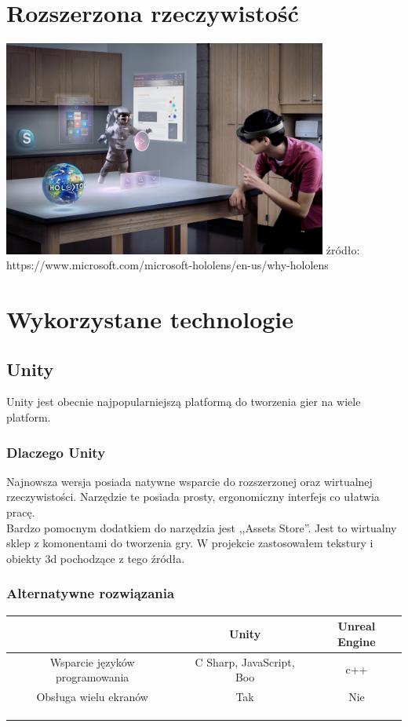 \documentclass[12pt]{article}
\begin{document}
\section{Rozszerzona rzeczywistość}

\begin{center}
\includegraphics[width=0.8\textwidth]{images/hololens.png}
\small {źródło: https://www.microsoft.com/microsoft-hololens/en-us/why-hololens }
\end{center}

\section{Wykorzystane technologie}

\subsection{Unity}
Unity jest obecnie najpopularniejszą platformą do tworzenia gier na wiele platform. 
\subsubsection{Dlaczego Unity}
Najnowsza wersja posiada natywne wsparcie do rozszerzonej oraz wirtualnej rzeczywistości. Narzędzie te posiada prosty, ergonomiczny interfejs co ułatwia pracę.\\
Bardzo pomocnym dodatkiem do narzędzia jest ,,Assets Store''. Jest to wirtualny sklep z komonentami do tworzenia gry. W projekcie zastosowałem tekstury i obiekty 3d pochodzące z tego źródła.
\subsubsection{Alternatywne rozwiązania}
 \begin{tabular}{|c|c|c|}
 \hline
 \ & Unity & Unreal Engine \\ 
  \hline
 Wsparcie języków programowania & C Sharp, JavaScript, Boo & c++ \\  
  \hline
 Obsługa wielu ekranów & Tak & Nie \\
 \hline  
  &  &  \\
  \hline   
  &  &  \\
  \hline   
  &  &  \\
  \hline   
\end{tabular}
\end{document}
